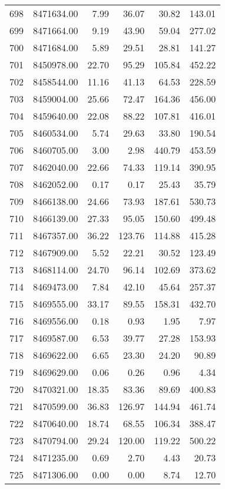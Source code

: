 \begin{table}[ht]
\begin{tabular}{rrrrrr}
  698 & 8471634.00 & 7.99 & 36.07 & 30.82 & 143.01 \\ 
  699 & 8471664.00 & 9.19 & 43.90 & 59.04 & 277.02 \\ 
  700 & 8471684.00 & 5.89 & 29.51 & 28.81 & 141.27 \\ 
  701 & 8450978.00 & 22.70 & 95.29 & 105.84 & 452.22 \\ 
  702 & 8458544.00 & 11.16 & 41.13 & 64.53 & 228.59 \\ 
  703 & 8459004.00 & 25.66 & 72.47 & 164.36 & 456.00 \\ 
  704 & 8459640.00 & 22.08 & 88.22 & 107.81 & 416.01 \\ 
  705 & 8460534.00 & 5.74 & 29.63 & 33.80 & 190.54 \\ 
  706 & 8460705.00 & 3.00 & 2.98 & 440.79 & 453.59 \\ 
  707 & 8462040.00 & 22.66 & 74.33 & 119.14 & 390.95 \\ 
  708 & 8462052.00 & 0.17 & 0.17 & 25.43 & 35.79 \\ 
  709 & 8466138.00 & 24.66 & 73.93 & 187.61 & 530.73 \\ 
  710 & 8466139.00 & 27.33 & 95.05 & 150.60 & 499.48 \\ 
  711 & 8467357.00 & 36.22 & 123.76 & 114.88 & 415.28 \\ 
  712 & 8467909.00 & 5.52 & 22.21 & 30.52 & 123.49 \\ 
  713 & 8468114.00 & 24.70 & 96.14 & 102.69 & 373.62 \\ 
  714 & 8469473.00 & 7.84 & 42.10 & 45.64 & 257.37 \\ 
  715 & 8469555.00 & 33.17 & 89.55 & 158.31 & 432.70 \\ 
  716 & 8469556.00 & 0.18 & 0.93 & 1.95 & 7.97 \\ 
  717 & 8469587.00 & 6.53 & 39.77 & 27.28 & 153.93 \\ 
  718 & 8469622.00 & 6.65 & 23.30 & 24.20 & 90.89 \\ 
  719 & 8469629.00 & 0.06 & 0.26 & 0.96 & 4.34 \\ 
  720 & 8470321.00 & 18.35 & 83.36 & 89.69 & 400.83 \\ 
  721 & 8470599.00 & 36.83 & 126.97 & 144.94 & 461.74 \\ 
  722 & 8470640.00 & 18.74 & 68.55 & 106.34 & 388.47 \\ 
  723 & 8470794.00 & 29.24 & 120.00 & 119.22 & 500.22 \\ 
  724 & 8471235.00 & 0.69 & 2.70 & 4.43 & 20.73 \\ 
  725 & 8471306.00 & 0.00 & 0.00 & 8.74 & 12.70 \\ 

\end{tabular}
\end{table}
